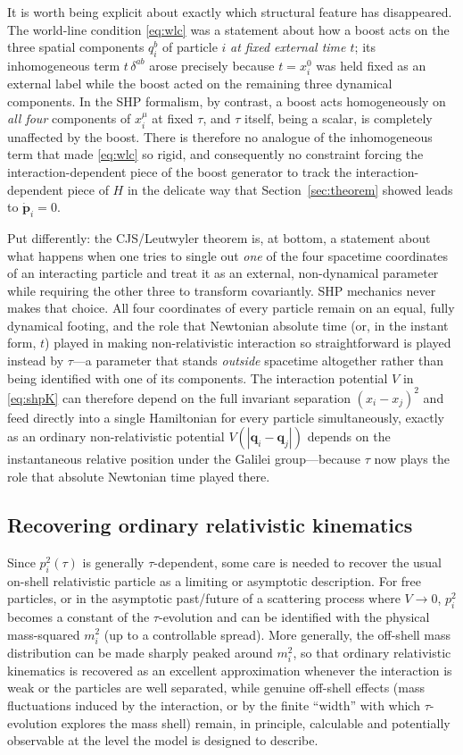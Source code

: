 \documentclass[11pt]{article}
\newcommand{\bq}{\mathbf{q}}
\newcommand{\bp}{\mathbf{p}}
\begin{document}
It is worth being explicit about exactly which structural feature has disappeared. The world-line condition \eqref{eq:wlc} was a statement about how a boost acts on the three spatial components $q_i^b$ of particle $i$ \emph{at fixed external time $t$}; its inhomogeneous term $t\,\delta^{ab}$ arose precisely because $t=x_i^0$ was held fixed as an external label while the boost acted on the remaining three dynamical components. In the SHP formalism, by contrast, a boost acts homogeneously on \emph{all four} components of $x_i^\mu$ at fixed $\tau$, and $\tau$ itself, being a scalar, is completely unaffected by the boost. There is therefore no analogue of the inhomogeneous term that made \eqref{eq:wlc} so rigid, and consequently no constraint forcing the interaction-dependent piece of the boost generator to track the interaction-dependent piece of $H$ in the delicate way that Section~\ref{sec:theorem} showed leads to $\dot{\bp}_i=0$.

Put differently: the CJS/Leutwyler theorem is, at bottom, a statement about what happens when one tries to single out \emph{one} of the four spacetime coordinates of an interacting particle and treat it as an external, non-dynamical parameter while requiring the other three to transform covariantly. SHP mechanics never makes that choice. All four coordinates of every particle remain on an equal, fully dynamical footing, and the role that Newtonian absolute time (or, in the instant form, $t$) played in making non-relativistic interaction so straightforward is played instead by $\tau$---a parameter that stands \emph{outside} spacetime altogether rather than being identified with one of its components. The interaction potential $V$ in \eqref{eq:shpK} can therefore depend on the full invariant separation $(x_i-x_j)^2$ and feed directly into a single Hamiltonian for every particle simultaneously, exactly as an ordinary non-relativistic potential $V(|\bq_i-\bq_j|)$ depends on the instantaneous relative position under the Galilei group---because $\tau$ now plays the role that absolute Newtonian time played there.

\subsection{Recovering ordinary relativistic kinematics}

Since $p_i^2(\tau)$ is generally $\tau$-dependent, some care is needed to recover the usual on-shell relativistic particle as a limiting or asymptotic description. For free particles, or in the asymptotic past/future of a scattering process where $V\to0$, $p_i^2$ becomes a constant of the $\tau$-evolution and can be identified with the physical mass-squared $m_i^2$ (up to a controllable spread). More generally, the off-shell mass distribution can be made sharply peaked around $m_i^2$, so that ordinary relativistic kinematics is recovered as an excellent approximation whenever the interaction is weak or the particles are well separated, while genuine off-shell effects (mass fluctuations induced by the interaction, or by the finite ``width'' with which $\tau$-evolution explores the mass shell) remain, in principle, calculable and potentially observable at the level the model is designed to describe.
\end{document}
